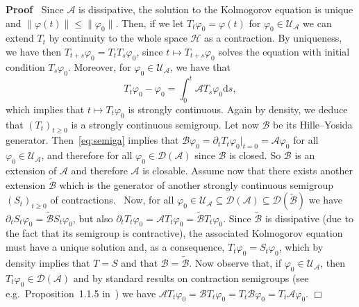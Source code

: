 \documentclass[10pt]{article}
\newcommand{\mathd}{\mathrm{d}}
\newenvironment{proof}{\noindent\textbf{Proof\ }}{\hspace*{\fill}$\Box$\medskip}
\begin{document}
\begin{proof}
  Since $\mathcal{A}$ is dissipative, the solution to the Kolmogorov equation
  is unique and $\| \varphi (t) \| \leqslant \| \varphi_0 \|$. Then, if we let
  $T_t \varphi_0 = \varphi (t)$ for $\varphi_0 \in \mathcal{U}_{\mathcal{A}}$
  we can extend $T_t$ by continuity to the whole space $\mathcal{H}$ as a
  contraction. By uniqueness, we have then $T_{t + s} \varphi_0 = T_t T_s
  \varphi_0$, since $t \mapsto T_{t + s} \varphi_0$ solves the equation with
  initial condition $T_s \varphi_0$. Moreover, for $\varphi_0 \in
  \mathcal{U}_{\mathcal{A}}$, we have that
  \begin{equation}
    T_t \varphi_0 - \varphi_0 = \int_0^t \mathcal{A}T_s \varphi_0 \mathd s,
    \label{eq:semiga}
  \end{equation}
  which implies that $t \mapsto T_t \varphi_0$ is strongly continuous. Again
  by density, we deduce that $(T_t)_{t \geqslant 0}$ is a strongly continuous
  semigroup. Let now $\mathcal{B}$ be its Hille--Yosida generator.
  Then~{\eqref{eq:semiga}} implies that $\mathcal{B} \varphi_0 = \partial_t
  T_t \varphi_0 |_{t = 0} =\mathcal{A} \varphi_0$ for all $\varphi_0 \in
  \mathcal{U}_{\mathcal{A}}$, and therefore for all $\varphi_0 \in \mathcal{D}
  (\mathcal{A})$ since $\mathcal{B}$ is closed. So $\mathcal{B}$ is an
  extension of $\mathcal{A}$ and therefore $\mathcal{A}$ is closable. Assume
  now that there exists another extension $\tilde{\mathcal{B}}$ which is the
  generator of another strongly continuous semigroup $(S_t)_{t \geqslant 0}$
  of contractions. \ Now, for all $\varphi_0 \in \mathcal{U}_{\mathcal{A}}
  \subseteq \mathcal{D} (\mathcal{A}) \subseteq \mathcal{D}
  (\tilde{\mathcal{B}})$ we have $\partial_t S_t \varphi_0 =
  \tilde{\mathcal{B}} S_t \varphi_0$, but also $\partial_t T_t \varphi_0
  =\mathcal{A}T_t \varphi_0 = \tilde{\mathcal{B}} T_t \varphi_0$. Since
  $\tilde{\mathcal{B}}$ is dissipative (due to the fact that its semigroup is
  contractive), the associated Kolmogorov equation must have a unique solution
  and, as a consequence, $T_t \varphi_0 = S_t \varphi_0$, which by density
  implies that $T = S$ and that $\mathcal{B}= \tilde{\mathcal{B}}$. Now
  observe that, if $\varphi_0 \in \mathcal{U}_{\mathcal{A}}$, then $T_t
  \varphi_0 \in \mathcal{D} (\mathcal{A})$ and by standard results on
  contraction semigroups (see e.g.~Proposition~1.1.5
  in~{\cite{ethier_markov_2005}}) we have $\mathcal{A}T_t \varphi_0
  =\mathcal{B}T_t \varphi_0 = T_t \mathcal{B} \varphi_0 = T_t \mathcal{A}
  \varphi_0$.
\end{proof}
\end{document}
